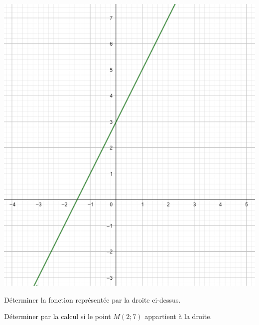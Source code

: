 \begin{center}
	\includegraphics[scale=0.5]{fct1}
	
\end{center}

\begin{questions}
	\question[2] Déterminer la fonction représentée par la droite ci-dessus.
	\fillwithdottedlines{7cm}
	
	\question[2] Déterminer par la calcul si le point $M(2; 7)$ appartient à la droite.
	
	\fillwithdottedlines{4cm}
\end{questions}

\label{LastPage}